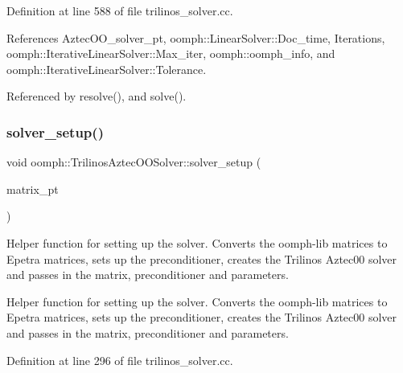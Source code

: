 Definition at line 588 of file trilinos\+\_\+solver.\+cc.



References Aztec\+O\+O\+\_\+solver\+\_\+pt, oomph\+::\+Linear\+Solver\+::\+Doc\+\_\+time, Iterations, oomph\+::\+Iterative\+Linear\+Solver\+::\+Max\+\_\+iter, oomph\+::oomph\+\_\+info, and oomph\+::\+Iterative\+Linear\+Solver\+::\+Tolerance.



Referenced by resolve(), and solve().

\mbox{\label{classoomph_1_1TrilinosAztecOOSolver_a1d5e7dfc9fe3c890569465a167c2f2fc}} 
\subsubsection{\texorpdfstring{solver\+\_\+setup()}{solver\_setup()}}
{\footnotesize\ttfamily void oomph\+::\+Trilinos\+Aztec\+O\+O\+Solver\+::solver\+\_\+setup (\begin{DoxyParamCaption}\item[{\hyperlink{classoomph_1_1DoubleMatrixBase}{Double\+Matrix\+Base} $\ast$const \&}]{matrix\+\_\+pt }\end{DoxyParamCaption})\hspace{0.3cm}{\ttfamily [protected]}}



Helper function for setting up the solver. Converts the oomph-\/lib matrices to Epetra matrices, sets up the preconditioner, creates the Trilinos Aztec00 solver and passes in the matrix, preconditioner and parameters. 

Helper function for setting up the solver. Converts the oomph-\/lib matrices to Epetra matrices, sets up the preconditioner, creates the Trilinos Aztec00 solver and passes in the matrix, preconditioner and parameters. 

Definition at line 296 of file trilinos\+\_\+solver.\+cc.



